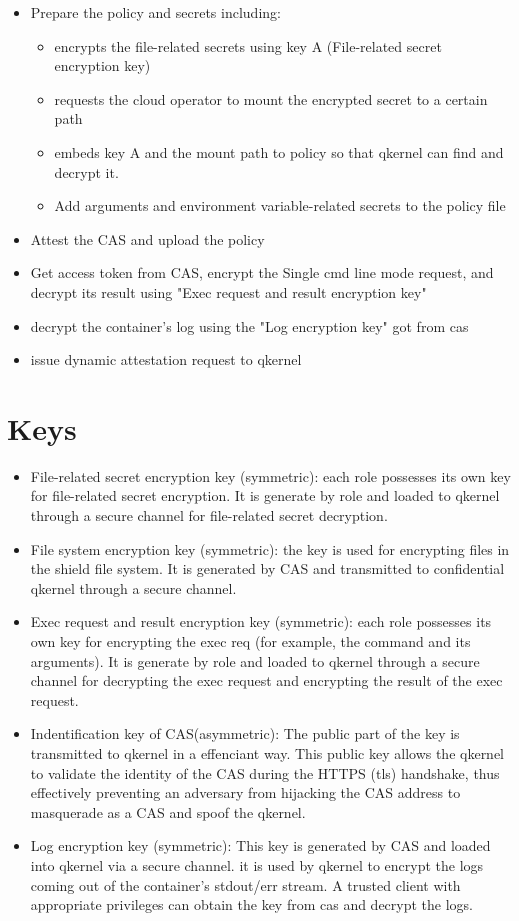 \begin{itemize}
    \item  Prepare the policy and secrets including:
    \begin{itemize}
        \item  encrypts the file-related secrets using key A (File-related secret encryption key)
        \item  requests the cloud operator to mount the encrypted secret to a certain path
        \item  embeds key A  and the mount path to policy so that qkernel can find and decrypt it.
        \item  Add arguments and environment variable-related secrets to the policy file
    \end{itemize}
    \item Attest the CAS and upload the policy
    \item  Get access token from CAS, encrypt the Single cmd line mode request, and decrypt its result using "Exec request and result encryption key"
    \item  decrypt the container's log using the "Log encryption key" got from cas
    \item  issue dynamic attestation request to qkernel
\end{itemize}


\section{Keys}

\begin{itemize}
    \item  File-related secret encryption key (symmetric): each role possesses its own key for file-related secret encryption. It is generate by role and loaded to qkernel through a secure channel for file-related secret decryption.
    \item  File system encryption key (symmetric): the key is used for encrypting files in the shield file system. It is generated by CAS and transmitted to confidential qkernel through a secure channel.
    \item  Exec request and result encryption key (symmetric): each role possesses its own key for encrypting the exec req (for example, the command and its arguments).  It is generate by role and loaded to qkernel through a secure channel for decrypting the exec request and encrypting the result of the exec request.
    \item  Indentification key of CAS(asymmetric): The public part of the key is transmitted to qkernel in a effenciant way.  This public key allows the qkernel to validate the identity of the CAS during the HTTPS (tls) handshake, thus effectively preventing an adversary from hijacking the CAS address to masquerade as a CAS and spoof the qkernel.
    \item  Log encryption key (symmetric): This key is generated by CAS and loaded into qkernel via a secure channel. it is used by qkernel to encrypt the logs coming out of the container's stdout/err stream. A trusted client with appropriate privileges can obtain the key from cas and decrypt the logs.
\end{itemize}
\cleardoublepage

